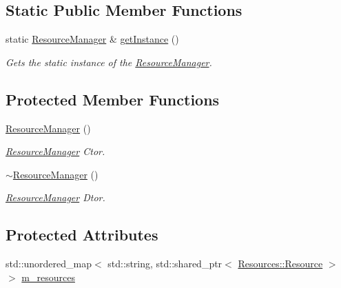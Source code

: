 \subsection*{Static Public Member Functions}
\begin{DoxyCompactItemize}
\item 
static \hyperlink{class_cookie_eng_1_1_res_mgmt_1_1_resource_manager}{Resource\+Manager} \& \hyperlink{class_cookie_eng_1_1_res_mgmt_1_1_resource_manager_a3ffc6fb81b9e9562d9c702b9e02c9f13}{get\+Instance} ()
\begin{DoxyCompactList}\small\item\em Gets the static instance of the \hyperlink{class_cookie_eng_1_1_res_mgmt_1_1_resource_manager}{Resource\+Manager}. \end{DoxyCompactList}\end{DoxyCompactItemize}
\subsection*{Protected Member Functions}
\begin{DoxyCompactItemize}
\item 
\hyperlink{class_cookie_eng_1_1_res_mgmt_1_1_resource_manager_abfe4d3430237d9faddf0e4d77050728b}{Resource\+Manager} ()
\begin{DoxyCompactList}\small\item\em \hyperlink{class_cookie_eng_1_1_res_mgmt_1_1_resource_manager}{Resource\+Manager} Ctor. \end{DoxyCompactList}\item 
\hyperlink{class_cookie_eng_1_1_res_mgmt_1_1_resource_manager_a39c067aab5b12a48673b3b8c1fd0e442}{$\sim$\+Resource\+Manager} ()
\begin{DoxyCompactList}\small\item\em \hyperlink{class_cookie_eng_1_1_res_mgmt_1_1_resource_manager}{Resource\+Manager} Dtor. \end{DoxyCompactList}\end{DoxyCompactItemize}
\subsection*{Protected Attributes}
\begin{DoxyCompactItemize}
\item 
std\+::unordered\+\_\+map$<$ std\+::string, std\+::shared\+\_\+ptr$<$ \hyperlink{class_cookie_eng_1_1_resources_1_1_resource}{Resources\+::\+Resource} $>$ $>$ \hyperlink{class_cookie_eng_1_1_res_mgmt_1_1_resource_manager_a0d7fb8ad7d37c75d3d364e4382467b2f}{m\+\_\+resources}
\end{DoxyCompactItemize}


